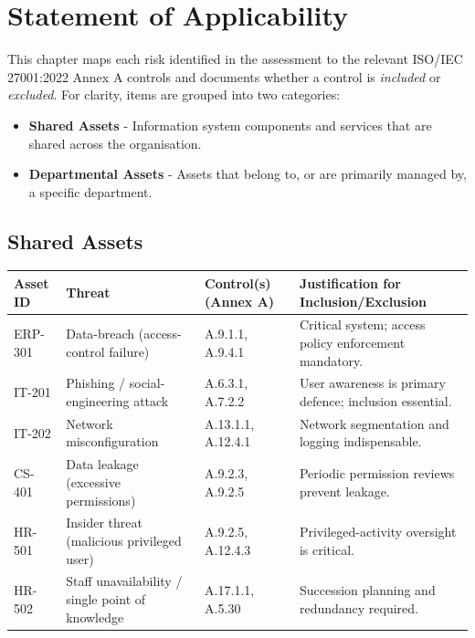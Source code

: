 \chapter{Statement of Applicability}
\label{chap:soa}

This chapter maps each risk identified in the assessment to the relevant ISO/IEC 27001:2022 Annex A controls and documents whether a control is \textit{included} or \textit{excluded}.  
For clarity, items are grouped into two categories:

\begin{itemize}
    \item \textbf{Shared Assets} - Information system components and services that are shared across the organisation.
    \item \textbf{Departmental Assets} - Assets that belong to, or are primarily managed by, a specific department.
\end{itemize}

\section{Shared Assets}

\begin{longtable}{|p{2.2cm}|p{4.3cm}|p{4.7cm}|p{3.5cm}|}
\hline
\textbf{Asset ID} & \textbf{Threat} & \textbf{Control(s)\,(Annex A)} & \textbf{Justification for Inclusion/Exclusion} \\
\hline
\endhead
ERP-301  & Data-breach (access-control failure)              & A.9.1.1, A.9.4.1 & Critical system; access policy enforcement mandatory. \\
\hline
IT-201   & Phishing / social-engineering attack              & A.6.3.1, A.7.2.2 & User awareness is primary defence; inclusion essential. \\
\hline
IT-202   & Network misconfiguration                          & A.13.1.1, A.12.4.1 & Network segmentation and logging indispensable. \\
\hline
CS-401   & Data leakage (excessive permissions)              & A.9.2.3, A.9.2.5 & Periodic permission reviews prevent leakage. \\
\hline
HR-501   & Insider threat (malicious privileged user)        & A.9.2.5, A.12.4.3 & Privileged-activity oversight is critical. \\
\hline
HR-502   & Staff unavailability / single point of knowledge  & A.17.1.1, A.5.30  & Succession planning and redundancy required. \\
\hline
\end{longtable}

